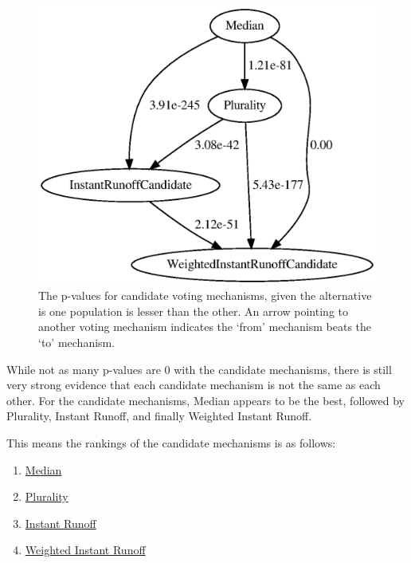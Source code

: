 \begin{figure}[htbp]
    \centering
    \includegraphics[scale=0.75]
    {./content/figures/voting_mechanisms/candidate-mechanisms-p-values.gv}
    \caption{The p-values for candidate voting mechanisms, given the alternative is one
    population is lesser than the other.
    An arrow pointing to another voting mechanism indicates the `from' mechanism
    beats the `to' mechanism.}
    \label{fig:candidate-mechanisms-p-values}
\end{figure}

While not as many p-values are 0 with the candidate mechanisms, there is still very
strong evidence that each candidate mechanism is not the same as each other.
For the candidate mechanisms, Median appears to be the best, followed
by Plurality, Instant Runoff, and finally Weighted Instant Runoff.
\begin{samepage}
    This means the rankings of the candidate mechanisms is as follows:
    \begin{enumerate}
        \item \hyperref[para:median]{Median}
        \item \hyperref[para:plurality]{Plurality}
        \item \hyperref[para:cand-instant-runoff]{Instant Runoff}
        \item \hyperref[para:cand-weighted-instant-runoff]{Weighted Instant Runoff}
    \end{enumerate}
\end{samepage}


